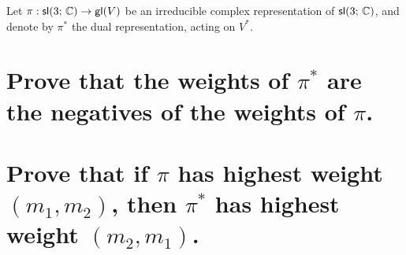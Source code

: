 \documentclass[
	pages,
	boxes,
	color=WildStrawberry
]{homework}
\begin{document}
\begin{problem}
Let $\pi: \mathsf{sl}(3;\, \mathbb{C}) \to \mathsf{gl}(V)$ be an irreducible complex representation of $\mathsf{sl}(3;\, \mathbb{C})$, and denote by $\pi^*$ the dual representation, acting on $V^*$.
\begin{parts}
	\part{Prove that the weights of $\pi^*$ are the negatives of the weights of $\pi$.}
	\part{Prove that if $\pi$ has highest weight $(m_1, m_2)$, then $\pi^*$ has highest weight $(m_2, m_1)$.}
\end{parts}
\end{problem}

\begin{solution}
\end{solution}
\end{document}
